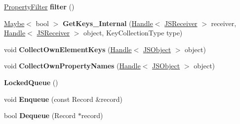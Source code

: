 \begin{DoxyCompactItemize}
\item 
\hyperlink{namespacev8_afbf02b6b1152a3e25d7bde90798209ac}{Property\+Filter} {\bfseries filter} ()\hypertarget{classv8_1_1internal_1_1_b_a_s_e___e_m_b_e_d_d_e_d_a1ecea1e3b95182d2b2f0820c224c56a8}{}\label{classv8_1_1internal_1_1_b_a_s_e___e_m_b_e_d_d_e_d_a1ecea1e3b95182d2b2f0820c224c56a8}

\item 
\hyperlink{classv8_1_1_maybe}{Maybe}$<$ bool $>$ {\bfseries Get\+Keys\+\_\+\+Internal} (\hyperlink{classv8_1_1internal_1_1_handle}{Handle}$<$ \hyperlink{classv8_1_1internal_1_1_j_s_receiver}{J\+S\+Receiver} $>$ receiver, \hyperlink{classv8_1_1internal_1_1_handle}{Handle}$<$ \hyperlink{classv8_1_1internal_1_1_j_s_receiver}{J\+S\+Receiver} $>$ object, Key\+Collection\+Type type)\hypertarget{classv8_1_1internal_1_1_b_a_s_e___e_m_b_e_d_d_e_d_af8d5b5700d4e22068b2fac6f0c6be80e}{}\label{classv8_1_1internal_1_1_b_a_s_e___e_m_b_e_d_d_e_d_af8d5b5700d4e22068b2fac6f0c6be80e}

\item 
void {\bfseries Collect\+Own\+Element\+Keys} (\hyperlink{classv8_1_1internal_1_1_handle}{Handle}$<$ \hyperlink{classv8_1_1internal_1_1_j_s_object}{J\+S\+Object} $>$ object)\hypertarget{classv8_1_1internal_1_1_b_a_s_e___e_m_b_e_d_d_e_d_a57d0930683bc4f959ae0eb9fd1d3af23}{}\label{classv8_1_1internal_1_1_b_a_s_e___e_m_b_e_d_d_e_d_a57d0930683bc4f959ae0eb9fd1d3af23}

\item 
void {\bfseries Collect\+Own\+Property\+Names} (\hyperlink{classv8_1_1internal_1_1_handle}{Handle}$<$ \hyperlink{classv8_1_1internal_1_1_j_s_object}{J\+S\+Object} $>$ object)\hypertarget{classv8_1_1internal_1_1_b_a_s_e___e_m_b_e_d_d_e_d_ad7fc1864595d2edc99d60e33faf78c10}{}\label{classv8_1_1internal_1_1_b_a_s_e___e_m_b_e_d_d_e_d_ad7fc1864595d2edc99d60e33faf78c10}

\item 
{\bfseries Locked\+Queue} ()\hypertarget{classv8_1_1internal_1_1_b_a_s_e___e_m_b_e_d_d_e_d_ab6159c4447f282a3986b9fb020f73932}{}\label{classv8_1_1internal_1_1_b_a_s_e___e_m_b_e_d_d_e_d_ab6159c4447f282a3986b9fb020f73932}

\item 
void {\bfseries Enqueue} (const Record \&record)\hypertarget{classv8_1_1internal_1_1_b_a_s_e___e_m_b_e_d_d_e_d_ab5f20079fcbf3fe7356803e008abc9ab}{}\label{classv8_1_1internal_1_1_b_a_s_e___e_m_b_e_d_d_e_d_ab5f20079fcbf3fe7356803e008abc9ab}

\item 
bool {\bfseries Dequeue} (Record $\ast$record)\hypertarget{classv8_1_1internal_1_1_b_a_s_e___e_m_b_e_d_d_e_d_a20ebb91cb02f02c7a0004a12b8b5d9a9}{}\label{classv8_1_1internal_1_1_b_a_s_e___e_m_b_e_d_d_e_d_a20ebb91cb02f02c7a0004a12b8b5d9a9}


\end{DoxyCompactItemize}
